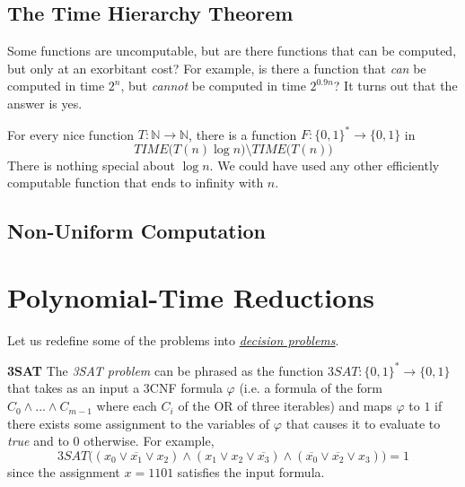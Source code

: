 \subsection{The Time Hierarchy Theorem}

  Some functions are uncomputable, but are there functions that can be computed, but only at an exorbitant cost? For example, is there a function that \textit{can} be computed in time $2^n$, but \textit{cannot} be computed in time $2^{0.9 n}$? It turns out that the answer is yes. 

  \begin{theorem}
    \label{thm:time-hierarchy-theorem}
  For every nice function $T: \mathbb{N} \to \mathbb{N}$, there is a function $F: \{0,1\}^* \to \{0,1\}$ in 
  \begin{equation}
    TIME \big( T(n) \log n\big) \setminus TIME \big( T(n)\big)
  \end{equation}
  There is nothing special about $\log n$. We could have used any other efficiently computable function that ends to infinity with $n$. 
  \end{theorem}

\subsection{Non-Uniform Computation}

\section{Polynomial-Time Reductions}

  Let us redefine some of the problems into \textit{\hyperref[def:decision-problem]{decision problems}}. 

  \textbf{3SAT} The \textit{3SAT problem} can be phrased as the function $3SAT: \{0,1\}^* \to \{0,1\}$ that takes as an input a 3CNF formula $\varphi$ (i.e. a formula of the form $C_0 \wedge ... \wedge C_{m-1}$ where each $C_i$ of the OR of three iterables) and maps $\varphi$ to $1$ if there exists some assignment to the variables of $\varphi$ that causes it to evaluate to \textit{true} and to $0$ otherwise. For example, 
  \begin{equation}
    3SAT \big( (x_0 \vee \overline{x_1} \vee x_2) \wedge (x_1 \vee x_2 \vee \overline{x_3}) \wedge (\overline{x_0} \vee \overline{x_2} \vee x_3) \big) = 1
  \end{equation}
  since the assignment $x = 1101$ satisfies the input formula. 

